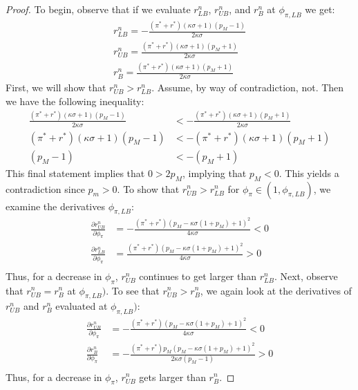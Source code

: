 \documentclass[11pt]{article}
\begin{document}
	\begin{proof}
		To begin, observe that if we evaluate $r^n_{LB}$, $r^n_{UB}$, and $r^n_{B}$ at $\phi_{\pi,LB}$ we get:
		\begin{align*}
			r^n_{LB} = -\frac{(\pi^* + r^*)(\kappa\sigma + 1)(p_M -1)}{2\kappa\sigma}\\
			r^n_{UB} =\frac{(\pi^* + r^*)(\kappa\sigma + 1)(p_M +1)}{2\kappa\sigma}\\
			r^n_{B} = \frac{(\pi^* + r^*)(\kappa\sigma + 1)(p_M +1)}{2\kappa\sigma}
		\end{align*}
		First, we will show that $r^n_{UB} > r^n_{LB}$. 
		Assume, by way of contradiction, not.  Then we have the following inequality: 
		\begin{align*}
			\frac{(\pi^* + r^*)(\kappa\sigma + 1)(p_M -1)}{2\kappa\sigma} &< -\frac{(\pi^* + r^*)(\kappa\sigma + 1)(p_M +1)}{2\kappa\sigma}\\
			(\pi^* + r^*)(\kappa\sigma + 1)(p_M -1) &< -(\pi^* + r^*)(\kappa\sigma + 1)(p_M +1)\\
			(p_M -1) &< -(p_M +1)
		\end{align*}
		This final statement implies that $0>2p_M$, implying that $p_M<0$. This yields a contradiction since $p_m>0$. To show that  $r^n_{UB} > r^n_{LB}$ for $\phi_{\pi}\in(1,\phi_{\pi,LB})$, we examine the derivatives $\phi_{\pi,LB}$: 
		\begin{align*}
			\frac{\partial r^n_{UB}}{\partial \phi_{\pi}} &= -\frac{(\pi^* + r^*)(p_M-\kappa\sigma(1+p_M)+1)^2}{4\kappa\sigma} < 0\\
			\frac{\partial r^n_{LB}}{\partial \phi_{\pi}} &= \frac{(\pi^* + r^*)(p_M-\kappa\sigma(1+p_M)+1)^2}{4\kappa\sigma} > 0\\
		\end{align*}
		Thus, for a decrease in  $\phi_{\pi}$, $r^n_{UB}$ continues to get larger than $r^n_{LB}$. 
		Next, observe that $r^n_{UB} = r^n_{B}$ at $\phi_{\pi,LB})$. To see that $r^n_{UB} > r^n_{B}$, we again look at the derivatives of $r^n_{UB}$ and $r^n_{B}$ evaluated at $\phi_{\pi,LB})$:
		\begin{align*}
			\frac{\partial r^n_{UB}}{\partial \phi_{\pi}} &= -\frac{(\pi^* + r^*)(p_M-\kappa\sigma(1+p_M)+1)^2}{4\kappa\sigma} < 0\\
			\frac{\partial r^n_{B}}{\partial \phi_{\pi}} &= -\frac{(\pi^* + r^*)p_M(p_M-\kappa\sigma(1+p_M)+1)^2}{2\kappa\sigma(p_M -1)} > 0\\
		\end{align*}
		Thus, for a decrease in  $\phi_{\pi}$, $r^n_{UB}$ gets larger than $r^n_{B}$. 
	\end{proof}
\end{document}
